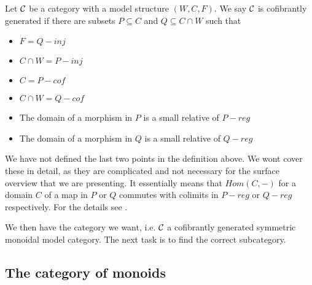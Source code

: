 \begin{definition}
Let $\mathcal{C}$ be a category with a model structure $(W, C, F)$. We say $\mathcal{C}$ is cofibrantly generated if there are subsets $P\subseteq C$ and $Q\subseteq C\cap W$ such that 
\begin{itemize}
    \item $F = Q-inj$
    \item $C\cap W = P-inj$
    \item $C = P-cof$
    \item $C\cap W = Q-cof$ 
    \item The domain of a morphism in $P$ is a small relative of $P-reg$
    \item The domain of a morphism in $Q$ is a small relative of $Q-reg$
\end{itemize}
\end{definition}

We have not defined the last two points in the definition above. We wont cover these in detail, as they are complicated and not necessary for the surface overview that we are presenting. It essentially means that $Hom(C,-)$ for a domain $C$ of a map in $P$ or $Q$ commutes with colimits in $P-reg$ or $Q-reg$ respectively. For the details see \cite{monoid}. 

We then have the category we want, i.e. $\mathcal{C}$ a cofibrantly generated symmetric monoidal model category. The next task is to find the correct subcategory. 





\subsection*{The category of monoids}


